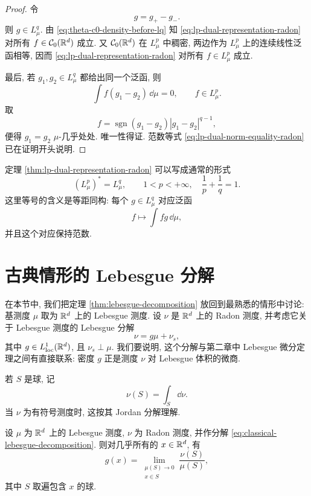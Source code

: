 \begin{proof}
	令
	\[
	g=g_+-g_-.
	\]
	则 \(g\in L^q_\mu\). 由 \eqref{eq:theta-c0-density-before-lq} 知
	\eqref{eq:lp-dual-representation-radon} 对所有 \(f\in\mathcal{C}_0(\mathbb{R}^d)\) 成立. 又 \(\mathcal{C}_0(\mathbb{R}^d)\) 在 \(L^p_\mu\) 中稠密, 两边作为 \(L^p_\mu\) 上的连续线性泛函相等, 因而 \eqref{eq:lp-dual-representation-radon} 对所有 \(f\in L^p_\mu\) 成立.
	
	最后, 若 \(g_1,g_2\in L^q_\mu\) 都给出同一个泛函, 则
	\[
	\int f(g_1-g_2)\,\dd\mu=0,
	\qquad f\in L^p_\mu.
	\]
	取
	\[
	f=\operatorname{sgn}(g_1-g_2)|g_1-g_2|^{q-1},
	\]
	便得 \(g_1=g_2\) \(\mu\)-几乎处处. 唯一性得证. 范数等式
	\eqref{eq:lp-dual-norm-equality-radon} 已在证明开头说明.
\end{proof}

\begin{rem}
	定理 \ref{thm:lp-dual-representation-radon} 可以写成通常的形式
	\[
	(L^p_\mu)^*=L^q_\mu,
	\qquad 1<p<+\infty,
	\quad \frac1p+\frac1q=1.
	\]
	这里等号的含义是等距同构: 每个 \(g\in L^q_\mu\) 对应泛函
	\[
	f\longmapsto \int fg\,\dd\mu,
	\]
	并且这个对应保持范数.
\end{rem}

\clearpage

\section{古典情形的 Lebesgue 分解}
\label{sec:classical-lebesgue-decomposition}

在本节中, 我们把定理 \ref{thm:lebesgue-decomposition} 放回到最熟悉的情形中讨论: 基测度 \(\mu\) 取为 \(\mathbb{R}^d\) 上的 Lebesgue 测度. 设 \(\nu\) 是 \(\mathbb{R}^d\) 上的 Radon 测度, 并考虑它关于 Lebesgue 测度的 Lebesgue 分解
\begin{equation}
	\nu=g\mu+\nu_s,
	\label{eq:classical-lebesgue-decomposition}
\end{equation}
其中 \(g\in L^1_{\operatorname{loc}}(\mathbb{R}^d)\), 且 \(\nu_s\perp\mu\). 我们要说明, 这个分解与第二章中 Lebesgue 微分定理之间有直接联系: 密度 \(g\) 正是测度 \(\nu\) 对 Lebesgue 体积的微商.

若 \(S\) 是球, 记
\[
\nu(S)=\int_S \dd\nu.
\]
当 \(\nu\) 为有符号测度时, 这按其 Jordan 分解理解.

\begin{thm}\label{thm:classical-lebesgue-decomposition-derivative}
	设 \(\mu\) 为 \(\mathbb{R}^d\) 上的 Lebesgue 测度, \(\nu\) 为 Radon 测度, 并作分解 \eqref{eq:classical-lebesgue-decomposition}. 则对几乎所有的 \(x\in\mathbb{R}^d\), 有
	\begin{equation}
		g(x)=
		\lim_{\substack{\mu(S)\to0\\ x\in S}}
		\frac{\nu(S)}{\mu(S)},
		\label{eq:rn-density-as-derivative}
	\end{equation}
	其中 \(S\) 取遍包含 \(x\) 的球.
\end{thm}

